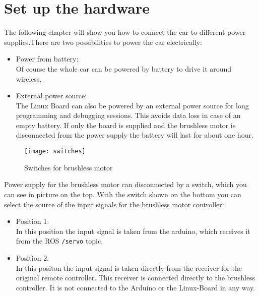 %
%


\chapter{Set up the hardware}
\label{sec:setup}

The following chapter will show you how to connect the car to different power supplies.There are two possibilities to power the car electrically:

\begin{itemize}
		\item Power from battery:\\
					Of course the whole car can be powered by battery to drive it around wireless.
		\item External power source: \\
					The Linux Board can also be powered by an external power source for long programming and debugging sessions. This avoids data loss in case of an empty battery. If only the board is supplied and the brushless motor is disconnected from the power supply the battery will last for about one hour.					
\end{itemize}



\begin{wrapfigure}[15]{l}{0.35\textwidth}
  \begin{center}
    \texttt{[image: switches]}
		\caption{Switches for brushless motor}
		\label{fig:switches}
  \end{center}	
\end{wrapfigure} 

Power supply for the brushless motor can disconnected by a switch, which you can see in picture  on the top. With the switch shown on the bottom you can select the source of the input signals for the brushless motor controller:

\begin{itemize}
\item Position 1:\\
In this position the input signal is taken from the arduino, which receives it from the ROS \texttt{/servo} topic.
\item Position 2:\\
In this positon the input signal is taken directly from the receiver for the original remote controller. This receiver is connected directly to the brushless controller. It is not connected to the Arduino or the Linux-Board in any way.
\end{itemize}



